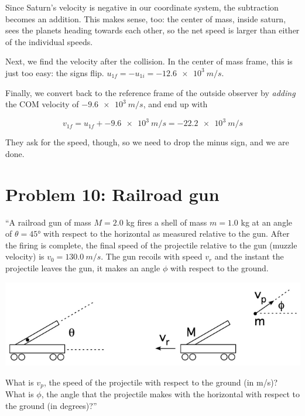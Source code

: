 \documentclass[12pt,a4paper]{report}
\begin{document}
Since Saturn's velocity is negative in our coordinate system, the subtraction becomes an addition. This makes sense, too: the center of mass, inside saturn, sees the planets heading towards each other, so the net speed is larger than either of the individual speeds.

Next, we find the velocity after the collision. In the center of mass frame, this is just too easy: the signs flip. $u_{1f} = -u_{1i} = \SI{-12.6e3}{m/s}$.

Finally, we convert back to the reference frame of the outside observer by \emph{adding} the COM velocity of $\SI{-9.6e3}{m/s}$, and end up with

\begin{equation}
v_{1f} = u_{1f} + \SI{-9.6e3}{m/s} = -\SI{22.2e3}{m/s}
\end{equation}

They ask for the speed, though, so we need to drop the minus sign, and we are done.

\section{Problem 10: Railroad gun}

``A railroad gun of mass $M = 2.0$ kg fires a shell of mass $m = 1.0$ kg at an angle of $\theta = \ang{45}$ with respect to the horizontal as measured relative to the gun. After the firing is complete, the final speed of the projectile relative to the gun (muzzle velocity) is $v_0 = \SI{130.0}{m/s}$. The gun recoils with speed $v_r$ and the instant the projectile leaves the gun, it makes an angle $\phi$ with respect to the ground.

\begin{center}
\includegraphics[scale=0.8]{Graphics/h6p10}
\end{center}

What is $v_p$, the speed of the projectile with respect to the ground (in m/s)?\\
What is $\phi$, the angle that the projectile makes with the horizontal with respect to the ground (in degrees)?''
\end{document}

